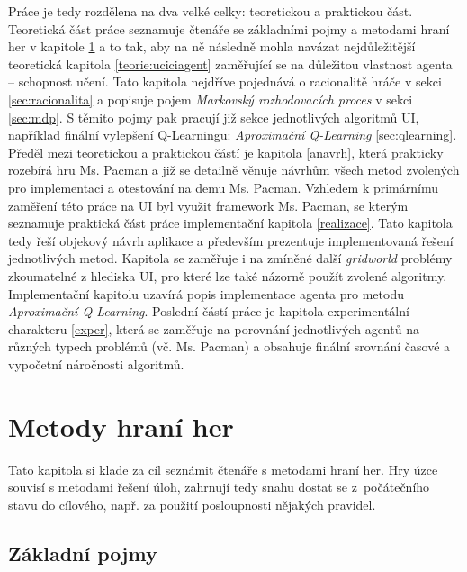 Práce je tedy rozdělena na dva velké celky: teoretickou a praktickou část. Teoretická část práce seznamuje čtenáře se základními pojmy a metodami hraní her v kapitole \ref{teorie:metodyapojmy} a to tak, aby na ně následně mohla navázat nejdůležitější teoretická kapitola \ref{teorie:uciciagent} zaměřující se na důležitou vlastnost agenta -- schopnost učení. Tato kapitola nejdříve pojednává o racionalitě hráče v sekci \ref{sec:racionalita} a popisuje pojem \textit{Markovský rozhodovacích proces} v sekci \ref{sec:mdp}. S těmito pojmy pak pracují již sekce jednotlivých algoritmů UI, například finální vylepšení Q-Learningu: \textit{Aproximační Q-Learning} \ref{sec:qlearning}. Předěl mezi teoretickou a praktickou částí je kapitola \ref{anavrh}, která prakticky rozebírá hru Ms. Pacman a již se detailně věnuje návrhům všech metod zvolených pro implementaci a otestování na demu Ms. Pacman. Vzhledem k primárnímu zaměření této práce na UI byl využit framework Ms. Pacman, se kterým seznamuje praktická část práce implementační kapitola \ref{realizace}. Tato kapitola tedy řeší objekový návrh aplikace a především prezentuje implementovaná řešení jednotlivých metod. Kapitola se zaměřuje i na zmíněné další \textit{gridworld} problémy zkoumatelné z hlediska UI, pro které lze také názorně použít zvolené algoritmy. Implementační kapitolu uzavírá popis implementace agenta pro metodu \textit{Aproximační Q-Learning}. Poslední částí práce je kapitola experimentální charakteru \ref{exper}, která se zaměřuje na porovnání jednotlivých agentů na různých typech problémů (vč. Ms. Pacman) a obsahuje finální srovnání časové a vypočetní náročnosti algoritmů.

\chapter{Metody hraní her}
\label{teorie:metodyapojmy}
Tato kapitola si klade za cíl seznámit čtenáře s metodami hraní her. Hry úzce souvisí s metodami řešení úloh, zahrnují tedy snahu dostat se z počátečního stavu do cílového, např. za použití posloupnosti nějakých pravidel. 

\section{Základní pojmy}

